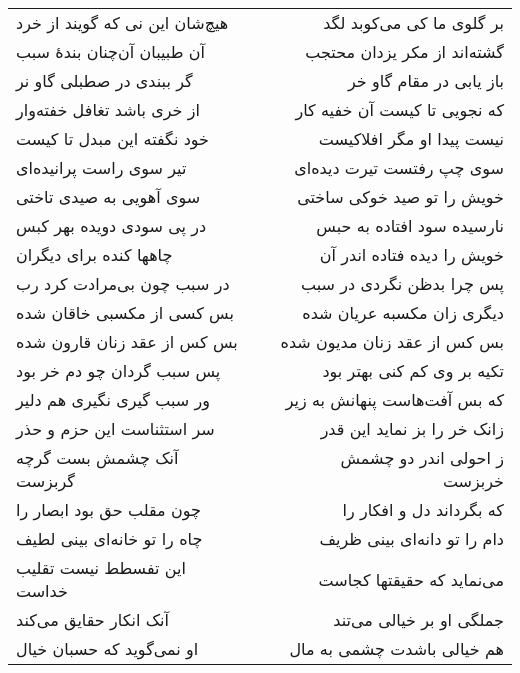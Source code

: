 \begin{center}
\begin{longtable}{l p{0.5cm} r}
هیچ‌شان این نی که گویند از خرد
&&
بر گلوی ما کی می‌کوبد لگد
\\
آن طبیبان آن‌چنان بندهٔ سبب
&&
گشته‌اند از مکر یزدان محتجب
\\
گر ببندی در صطبلی گاو نر
&&
باز یابی در مقام گاو خر
\\
از خری باشد تغافل خفته‌وار
&&
که نجویی تا کیست آن خفیه کار
\\
خود نگفته این مبدل تا کیست
&&
نیست پیدا او مگر افلاکیست
\\
تیر سوی راست پرانیده‌ای
&&
سوی چپ رفتست تیرت دیده‌ای
\\
سوی آهویی به صیدی تاختی
&&
خویش را تو صید خوکی ساختی
\\
در پی سودی دویده بهر کبس
&&
نارسیده سود افتاده به حبس
\\
چاهها کنده برای دیگران
&&
خویش را دیده فتاده اندر آن
\\
در سبب چون بی‌مرادت کرد رب
&&
پس چرا بدظن نگردی در سبب
\\
بس کسی از مکسبی خاقان شده
&&
دیگری زان مکسبه عریان شده
\\
بس کس از عقد زنان قارون شده
&&
بس کس از عقد زنان مدیون شده
\\
پس سبب گردان چو دم خر بود
&&
تکیه بر وی کم کنی بهتر بود
\\
ور سبب گیری نگیری هم دلیر
&&
که بس آفت‌هاست پنهانش به زیر
\\
سر استثناست این حزم و حذر
&&
زانک خر را بز نماید این قدر
\\
آنک چشمش بست گرچه گربزست
&&
ز احولی اندر دو چشمش خربزست
\\
چون مقلب حق بود ابصار را
&&
که بگرداند دل و افکار را
\\
چاه را تو خانه‌ای بینی لطیف
&&
دام را تو دانه‌ای بینی ظریف
\\
این تفسطط نیست تقلیب خداست
&&
می‌نماید که حقیقتها کجاست
\\
آنک انکار حقایق می‌کند
&&
جملگی او بر خیالی می‌تند
\\
او نمی‌گوید که حسبان خیال
&&
هم خیالی باشدت چشمی به مال
\\
\end{longtable}
\end{center}
